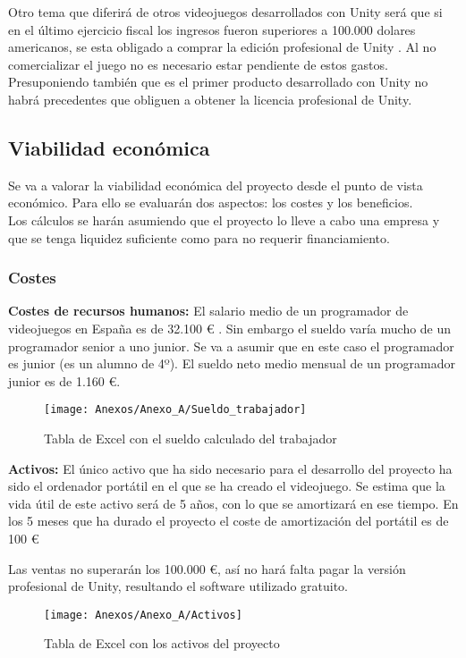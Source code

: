 Otro tema que diferirá de otros videojuegos desarrollados con Unity será que si en el último ejercicio fiscal los ingresos fueron superiores a 100.000 dolares americanos, se esta obligado a comprar la edición profesional de Unity \cite{FAQUnity}. Al no comercializar el juego no es necesario estar pendiente de estos gastos. Presuponiendo también que es el primer producto desarrollado con Unity no habrá precedentes que obliguen a obtener la licencia profesional de Unity.

\subsection{Viabilidad económica}
Se va a valorar la viabilidad económica del proyecto desde el punto de vista económico. Para ello se evaluarán dos aspectos: los costes y los beneficios.\\
Los cálculos se harán asumiendo que el proyecto lo lleve a cabo una empresa y que se tenga liquidez suficiente como para no requerir financiamiento.

\subsubsection{Costes}
\textbf{Costes de recursos humanos:}
El salario medio de un programador de videojuegos en España es de 32.100 € \cite{Sueldo}. Sin embargo el sueldo varía mucho de un programador senior a uno junior. Se va a asumir que en este caso el programador es junior (es un alumno de 4º). El sueldo neto medio mensual de un programador junior es de 1.160 €.

\begin{figure}[h]
\centering
\texttt{[image: Anexos/Anexo\_A/Sueldo\_trabajador]}
\caption{Tabla de Excel con el sueldo calculado del trabajador}
\end{figure}

\textbf{Activos:}
El único activo que ha sido necesario para el desarrollo del proyecto ha sido el ordenador portátil en el que se ha creado el videojuego. Se estima que la vida útil de este activo será de 5 años, con lo que se amortizará en ese tiempo. En los 5 meses que ha durado el proyecto el coste de amortización del portátil es de 100 €

Las ventas no superarán los 100.000 €, así no hará falta pagar la versión profesional de Unity, resultando el software utilizado gratuito.

\begin{figure}[h]
\centering
\texttt{[image: Anexos/Anexo\_A/Activos]}
\caption{Tabla de Excel con los activos del proyecto}
\end{figure}

